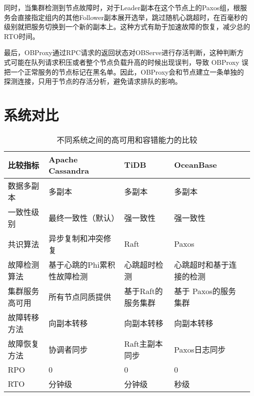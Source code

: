 同时，当集群检测到节点故障时，对于Leader副本在这个节点上的Paxos组，根服务会直接指定组内的其他Follower副本展开选举，跳过随机心跳超时，在百毫秒的级别就把服务切换到一个新的副本上。这种方式有助于加速故障的恢复，减少总的RTO时间。

最后，OBProxy通过RPC请求的返回状态对OBServe进行存活判断，这种判断方式可能在队列请求积压或者整个节点负载升高的时候出现误判，导致 OBProxy 误把一个正常服务的节点标记在黑名单。因此，OBProxy会和节点建立一条单独的探测连接，只用于节点的存活分析，避免请求排队的影响。

\section{系统对比}


\begin{table}[h!]
  \centering
  \caption{不同系统之间的高可用和容错能力的比较}
  \label{tab:ha-comparison}
  \begin{tabular}{@{}lllll@{}}
      \toprule
      比较指标 & Apache Cassandra & TiDB & OceanBase\\
      \midrule
      数据多副本 & 多副本 & 多副本 & 多副本  \\
      一致性级别 & 最终一致性（默认） & 强一致性 & 强一致性  \\
      共识算法 & 异步复制和冲突修复 & Raft & Paxos\\
      故障检测算法 & 基于心跳的Phi累积性故障检测 & 心跳超时检测 & 心跳超时和基于连接的检测 \\
      集群服务高可用 & 所有节点同质提供 & 基于Raft的服务集群 & 基于 Paxos的服务集群 \\
      故障转移方法 &向副本转移& 向副本转移 & 向副本转移\\
      故障恢复方法 &协调者同步 & Raft主副本同步 & Paxos日志同步\\
      RPO & 0 & 0 & 0\\
      RTO & 分钟级& 分钟级 & 秒级\\



      \bottomrule
  \end{tabular}
\end{table}
